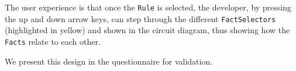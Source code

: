 The user experience is that once the \texttt{Rule} is selected, the developer, by pressing the up and down arrow keys, can step through the different \texttt{FactSelectors} (highlighted in yellow) and shown in the circuit diagram, thus showing how the \texttt{Facts} relate to each other.

We present this design in the questionnaire for validation.

